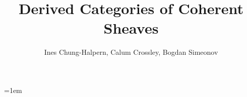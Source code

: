 \documentclass{article}
\title{Derived Categories of Coherent Sheaves}
\author{Ines Chung-Halpern, Calum Crossley, Bogdan Simeonov}
\date{}
\begin{document}



\newpage

\newpage

%
\newpage
\emergencystretch=1em
\printbibliography
\end{document}
